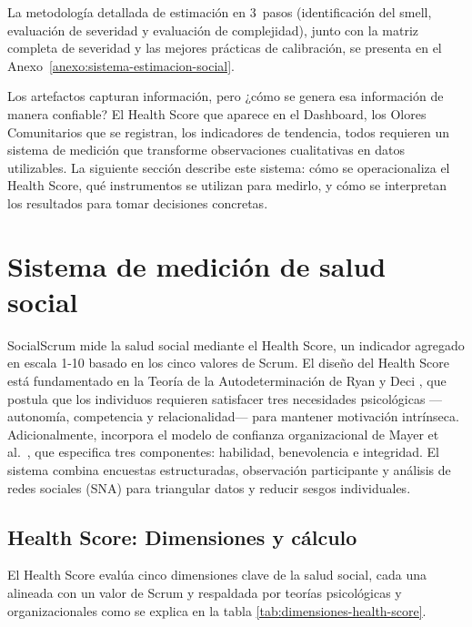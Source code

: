 La metodología detallada de estimación en 3~pasos (identificación del smell, evaluación de severidad y evaluación de complejidad), junto con la matriz completa de severidad y las mejores prácticas de calibración, se presenta en el Anexo~\ref{anexo:sistema-estimacion-social}.

Los artefactos capturan información, pero ¿cómo se genera esa información de manera confiable? El Health Score que aparece en el Dashboard, los Olores Comunitarios que se registran, los indicadores de tendencia, todos requieren un sistema de medición que transforme observaciones cualitativas en datos utilizables. La siguiente sección describe este sistema: cómo se operacionaliza el Health Score, qué instrumentos se utilizan para medirlo, y cómo se interpretan los resultados para tomar decisiones concretas.

\section{Sistema de medición de salud social}
\label{sec:sistema-medicion-salud-social}

SocialScrum mide la salud social mediante el Health Score, un indicador agregado en escala 1-10 basado en los cinco valores de Scrum. El diseño del Health Score está fundamentado en la Teoría de la Autodeterminación de Ryan y Deci \cite{ryan2000self}, que postula que los individuos requieren satisfacer tres necesidades psicológicas ---autonomía, competencia y relacionalidad--- para mantener motivación intrínseca. Adicionalmente, incorpora el modelo de confianza organizacional de Mayer et al.\ \cite{mayer1995integrative}, que especifica tres componentes: habilidad, benevolencia e integridad. El sistema combina encuestas estructuradas, observación participante y análisis de redes sociales (SNA) para triangular datos y reducir sesgos individuales.

\subsection{Health Score: Dimensiones y cálculo}

El Health Score evalúa cinco dimensiones clave de la salud social, cada una alineada con un valor de Scrum y respaldada por teorías psicológicas y organizacionales como se explica en la tabla \ref{tab:dimensiones-health-score}.

\begingroup
\scriptsize
\renewcommand{\arraystretch}{1.4}
\setlength{\tabcolsep}{4pt}
\setlength{\LTleft}{0pt}
\setlength{\LTright}{0pt}

